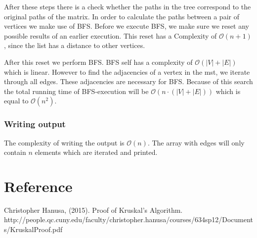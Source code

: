 \documentclass{article}
\newcommand{\bigO}[1]{\mathcal{O}(#1)}
\begin{document}
After these steps there is a check whether the paths in the tree correspond to the original paths of the matrix. In order to calculate the paths between a pair of vertices we make use of BFS. Before we execute BFS, we make sure we reset any possible results of an earlier execution. This reset has a Complexity of $\bigO{n + 1}$, since the list has a distance to other vertices.

After this reset we perform BFS. BFS self has a complexity of $\bigO{|V| + |E|}$ which is linear. However to find the adjacencies of a vertex in the mst, we iterate through all edges. These adjacencies are necessary for BFS. Because of this search the total running time of BFS-execution will be $\bigO{n \cdot (|V| + |E|)}$ which is equal to $\bigO{n^2}$.

\subsubsection{Writing output}
The complexity of writing the output is $\bigO{n}$. The array with edges will only contain $n$ elements which are iterated and printed.

\newpage
\section{Reference}

Christopher Hanusa, (2015). Proof of Kruskal’s Algorithm. \newline
http://people.qc.cuny.edu/faculty/christopher.hanusa/courses/634sp12/Documents/KruskalProof.pdf
\end{document}
